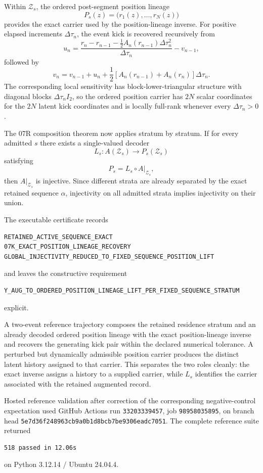 \documentclass[11pt]{book}
\begin{document}
Within $\mathcal Z_s$, the ordered post-segment position lineage
\[
P_s(z)=\bigl(r_1(z),\ldots,r_N(z)\bigr)
\]
provides the exact carrier used by the position-lineage inverse. For positive elapsed increments $\Delta\tau_n$, the event kick is recovered recursively from
\[
u_n=
\frac{r_n-r_{n-1}-\tfrac12 A_n(r_{n-1})\Delta\tau_n^2}
{\Delta\tau_n}-v_{n-1},
\]
followed by
\[
v_n=v_{n-1}+u_n+
\frac12\left[A_n(r_{n-1})+A_n(r_n)\right]\Delta\tau_n.
\]
The corresponding local sensitivity has block-lower-triangular structure with diagonal blocks $\Delta\tau_n I_2$, so the ordered position carrier has $2N$ scalar coordinates for the $2N$ latent kick coordinates and is locally full-rank whenever every $\Delta\tau_n>0$.

The 07R composition theorem now applies stratum by stratum. If for every admitted $s$ there exists a single-valued decoder
\[
L_s:A(\mathcal Z_s)\rightarrow P_s(\mathcal Z_s)
\]
satisfying
\[
P_s=L_s\circ A|_{\mathcal Z_s},
\]
then $A|_{\mathcal Z_s}$ is injective. Since different strata are already separated by the exact retained sequence $\alpha$, injectivity on all admitted strata implies injectivity on their union.

The executable certificate records
\begin{verbatim}
RETAINED_ACTIVE_SEQUENCE_EXACT
07K_EXACT_POSITION_LINEAGE_RECOVERY
GLOBAL_INJECTIVITY_REDUCED_TO_FIXED_SEQUENCE_POSITION_LIFT
\end{verbatim}
and leaves the constructive requirement
\begin{verbatim}
Y_AUG_TO_ORDERED_POSITION_LINEAGE_LIFT_PER_FIXED_SEQUENCE_STRATUM
\end{verbatim}
explicit.

A two-event reference trajectory composes the retained residence stratum and an already decoded ordered position lineage with the exact position-lineage inverse and recovers the generating kick pair within the declared numerical tolerance. A perturbed but dynamically admissible position carrier produces the distinct latent history assigned to that carrier. This separates the two roles cleanly: the exact inverse assigns a history to a supplied carrier, while $L_s$ identifies the carrier associated with the retained augmented record.

Hosted reference validation after correction of the corresponding negative-control expectation used GitHub Actions run \texttt{33203339457}, job \texttt{98958035895}, on branch head \texttt{5e7d36f248963cb9a0b1d8bcb7be9306eadc7051}. The complete reference suite returned
\begin{verbatim}
518 passed in 12.06s
\end{verbatim}
on Python 3.12.14 / Ubuntu 24.04.4.
\end{document}
